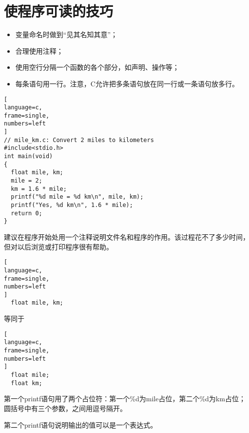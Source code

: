 \section{使程序可读的技巧}
\begin{frame}[fragile]
\begin{itemize}
\item 变量命名时做到“见其名知其意”；\\[0.1in]
\item 合理使用注释；\\[0.1in]
\item 使用空行分隔一个函数的各个部分，如声明、操作等；\\[0.1in]
\item 每条语句用一行。注意，C允许把多条语句放在同一行或一条语句放多行。
\end{itemize}
\end{frame}


\begin{frame}[fragile]
\begin{lstlisting}[
language=c,
frame=single,
numbers=left
]
// mile_km.c: Convert 2 miles to kilometers
#include<stdio.h>
int main(void) 
{
  float mile, km;	
  mile = 2;
  km = 1.6 * mile;
  printf("%d mile = %d km\n", mile, km);
  printf("Yes, %d km\n", 1.6 * mile);
  return 0;
}
\end{lstlisting}
\end{frame}


\begin{frame}[fragile]
建议在程序开始处用一个注释说明文件名和程序的作用。该过程花不了多少时间，但对以后浏览或打印程序很有帮助。
\end{frame}

\begin{frame}[fragile]
\begin{lstlisting}[
language=c,
frame=single,
numbers=left
]
  float mile, km;
\end{lstlisting}
等同于
\begin{lstlisting}[
language=c,
frame=single,
numbers=left
]
  float mile;
  float km;
\end{lstlisting}
\end{frame}

\begin{frame}[fragile]
第一个printf语句用了两个占位符：第一个\%d为mile占位，第二个\%d为km占位；圆括号中有三个参数，之间用逗号隔开。\vspace{0.1in}

第二个printf语句说明输出的值可以是一个表达式。
\end{frame}
